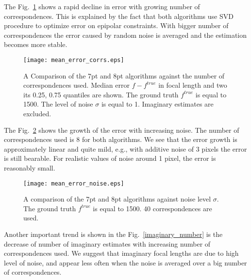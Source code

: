 The Fig.~\ref{mean_v_corrs} shows a rapid decline in error with growing number of correspondences. This is explained by the fact that both algorithms use SVD procedure to optimize error on epipolar constraints. With bigger number of correspondences the error caused by random noise is averaged and the estimation becomes more stable. %

\begin{figure}[h!]
  \begin{center}
    \texttt{[image: mean\_error\_corrs.eps]}
    \caption[Error in focal length versus number of correspondences]{A Comparison of the 7pt and 8pt algorithms against the number of correspondences used. Median error $f - f^{true}$ in focal length and two its 0.25, 0.75 quantiles are shown. The ground truth $f^{true}$ is equal to 1500. The level of noise $\sigma$ is equal to 1. Imaginary estimates are excluded. }
    \label{mean_v_corrs}
  \end{center}
\end{figure}

The Fig.~\ref{mean_v_noise} shows the growth of the error with increasing noise. The number of  correspondences used is 8 for both algorithms. We see that the error growth is approximately linear and quite mild, e.g., with additive noise of 3 pixels the error is still bearable. For realistic values of noise around 1 pixel, the error is reasonably small.



\begin{figure}[h!]
  \begin{center}
    \texttt{[image: mean\_error\_noise.eps]}
    \caption[Error in focal length versus level of noise]{A comparison of the 7pt and 8pt algorithms against noise level $\sigma$. The ground truth $f^{true}$ is equal to 1500. 40 correspondences are used.}
    \label{mean_v_noise}
  \end{center}
\end{figure}

Another important trend  is shown in the Fig.~\ref{imaginary_number} is the decrease of number of imaginary estimates with increasing number of correspondences used. We suggest that imaginary focal lengths are due to high level of noise, and appear less often when the noise is averaged over a  big number of correspondences.


